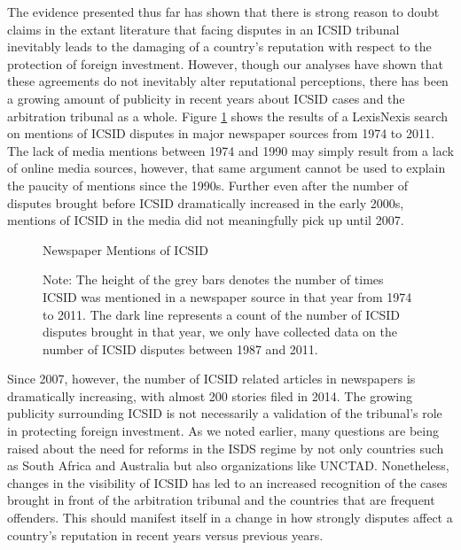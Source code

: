 \documentclass[12pt,onesided]{amsart}
\begin{document}
The evidence presented thus far has shown that there is strong reason to doubt claims in the extant literature that facing disputes in an ICSID tribunal inevitably leads to the damaging of a country's reputation with respect to the protection of foreign investment. However, though our analyses have shown that these agreements do not inevitably alter reputational perceptions, there has been a growing amount of publicity in recent years about ICSID cases and the arbitration tribunal as a whole. Figure \ref{fig:icsidMedia} shows the results of a LexisNexis search on mentions of ICSID disputes in major newspaper sources from 1974 to 2011. The lack of media mentions between 1974 and 1990 may simply result from a lack of online media sources, however, that same argument cannot be used to explain the paucity of mentions since the 1990s. Further even after the number of disputes brought before ICSID dramatically increased in the early 2000s, mentions of ICSID in the media did not meaningfully pick up until 2007. 

\begin{figure}[ht]
	\vspace{4cm}
	\centering
	\caption{Newspaper Mentions of ICSID}
	\label{fig:icsidMedia}
	\resizebox{1\textwidth}{!}{}
	\caption*{Note: The height of the grey bars denotes the number of times ICSID was mentioned in a newspaper source in that year from 1974 to 2011. The dark line represents a count of the number of ICSID disputes brought in that year, we only have collected data on the number of ICSID disputes between 1987 and 2011.}
\end{figure}

Since 2007, however, the number of ICSID related articles in newspapers is dramatically increasing, with almost 200 stories filed in 2014. The growing publicity surrounding ICSID is not necessarily a validation of the tribunal's role in protecting foreign investment. As we noted earlier, many questions are being raised about the need for reforms in the ISDS regime by not only countries such as South Africa and Australia but also organizations like UNCTAD. Nonetheless, changes in the visibility of ICSID has led to an increased recognition of the cases brought in front of the arbitration tribunal and the countries that are frequent offenders. This should manifest itself in a change in how strongly disputes affect a country's reputation in recent years versus previous years.
\end{document}
